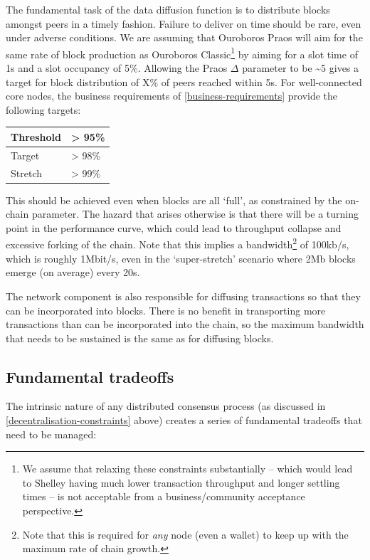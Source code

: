 \documentclass[11pt,a4paper]{article}
\begin{document}
The fundamental task of the data diffusion function is to distribute
blocks amongst peers in a timely fashion. Failure to deliver on time
should be rare, even under adverse conditions. We are assuming that
Ouroboros Praos will aim for the same rate of block production as
Ouroboros Classic\footnote{We assume that relaxing these constraints
substantially -- which would lead to Shelley having much lower
transaction throughput and longer settling times -- is not acceptable
from a business/community acceptance perspective.} by aiming for a
slot time of 1s and a slot occupancy of 5\%. Allowing the Praos $\Delta$
parameter to be \textasciitilde{}5 gives a target for block 
distribution of X\% of peers reached within 5s. For well-connected
core nodes, the business requirements of \ref{business-requirements}
provide the following targets:

\begin{longtable}[]{@{}ll@{}}
  \toprule
  Threshold & \textgreater{} 95\%\tabularnewline
  \endhead
  Target & \textgreater{} 98\%\tabularnewline
  Stretch & \textgreater{} 99\%\tabularnewline
  \bottomrule
\end{longtable}

This should be achieved even when blocks are all `full', as constrained
by the on-chain parameter. The hazard that arises otherwise is that
there will be a turning point in the performance curve, which could lead
to throughput collapse and excessive forking of the chain. Note that 
this implies a bandwidth\footnote{Note that this is required for \emph{any}
node (even a wallet) to keep up with the maximum rate of chain growth.} 
of 100kb/s, which is roughly 1Mbit/s, even in the `super-stretch'
scenario where 2Mb blocks emerge (on average) every 20s.

The network component is also responsible for diffusing transactions so
that they can be incorporated into blocks. There is no benefit in
transporting more transactions than can be incorporated into the chain,
so the maximum bandwidth that needs to be sustained is the same as for 
diffusing blocks.

\subsection{Fundamental tradeoffs}
\label{fundamental-tradeoffs}

The intrinsic nature of any distributed consensus process (as discussed
in \cref{decentralisation-constraints} above)
creates a series of fundamental tradeoffs that need to be managed:
\end{document}
